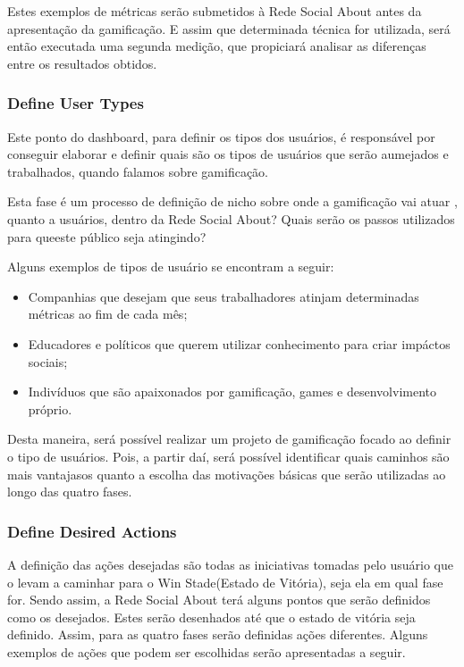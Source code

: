 Estes exemplos de métricas serão submetidos à Rede Social About antes da apresentação da
gamificação. E assim que determinada técnica for utilizada, será então executada
 uma
segunda medição, que propiciará analisar as diferenças entre os resultados obtidos.

\subsubsection{Define User Types}
\label{sub:define_user_types}
Este ponto do dashboard, para definir os tipos dos usuários, é responsável por conseguir
elaborar e definir quais são os tipos de usuários que serão aumejados e trabalhados, quando
falamos sobre gamificação.

Esta fase é um processo de definição de nicho sobre onde a gamificação vai atuar
, quanto a
usuários, dentro da Rede Social About? Quais serão os passos utilizados para queeste público
seja atingindo?

Alguns exemplos de tipos de usuário se encontram a seguir:

\begin{itemize}
    \item Companhias que desejam que seus trabalhadores atinjam determinadas métricas
        ao fim de cada mês;
    \item Educadores e políticos que querem utilizar conhecimento para criar impáctos
        sociais;
    \item Indivíduos que são apaixonados por gamificação, games e desenvolvimento próprio.
\end{itemize}

Desta maneira, será possível realizar um projeto de gamificação focado ao definir o tipo
de usuários. Pois, a partir daí, será possível identificar quais caminhos são mais vantajasos
quanto a escolha das motivações básicas que serão utilizadas ao longo das quatro fases.

\subsubsection{Define Desired Actions}
\label{sub:define_desired_actions}
A definição das ações desejadas são todas as iniciativas tomadas pelo usuário que o levam a caminhar para
o Win Stade(Estado de Vitória), seja ela em qual fase for. Sendo assim, a Rede Social
About terá alguns pontos que serão definidos como os desejados. Estes serão desenhados
até que o estado de vitória seja definido. Assim, para as quatro fases serão definidas
ações diferentes. Alguns exemplos de ações que podem ser escolhidas serão apresentadas
a seguir.

